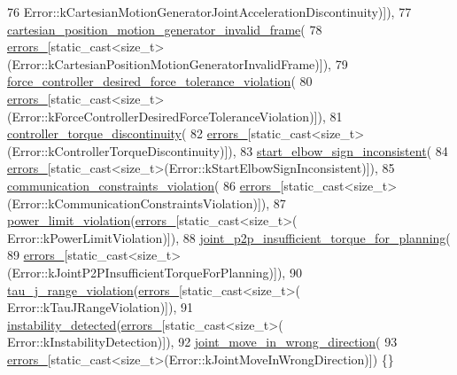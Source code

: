 \begin{DoxyCode}
76           Error::kCartesianMotionGeneratorJointAccelerationDiscontinuity)]),
77       \hyperlink{structfranka_1_1Errors_aa1952c6da2f81578861a19b947c97b85}{cartesian\_position\_motion\_generator\_invalid\_frame}(
78           \hyperlink{structfranka_1_1Errors_ab269bb0ad30eb1aaa7009a246be8e8aa}{errors\_}[static\_cast<size\_t>(Error::kCartesianPositionMotionGeneratorInvalidFrame)]),
79       \hyperlink{structfranka_1_1Errors_ae474f20a64b2585dbe6496966dddff0a}{force\_controller\_desired\_force\_tolerance\_violation}(
80           \hyperlink{structfranka_1_1Errors_ab269bb0ad30eb1aaa7009a246be8e8aa}{errors\_}[static\_cast<size\_t>(Error::kForceControllerDesiredForceToleranceViolation)]),
81       \hyperlink{structfranka_1_1Errors_af40d93759ace9ee6026208110692a732}{controller\_torque\_discontinuity}(
82           \hyperlink{structfranka_1_1Errors_ab269bb0ad30eb1aaa7009a246be8e8aa}{errors\_}[static\_cast<size\_t>(Error::kControllerTorqueDiscontinuity)]),
83       \hyperlink{structfranka_1_1Errors_aa6de1956ac056792a1dea6b9ddd52a50}{start\_elbow\_sign\_inconsistent}(
84           \hyperlink{structfranka_1_1Errors_ab269bb0ad30eb1aaa7009a246be8e8aa}{errors\_}[static\_cast<size\_t>(Error::kStartElbowSignInconsistent)]),
85       \hyperlink{structfranka_1_1Errors_a4d17af86c1ebb698c218796fa15f9bd7}{communication\_constraints\_violation}(
86           \hyperlink{structfranka_1_1Errors_ab269bb0ad30eb1aaa7009a246be8e8aa}{errors\_}[static\_cast<size\_t>(Error::kCommunicationConstraintsViolation)]),
87       \hyperlink{structfranka_1_1Errors_a6c4d8cb1fb314567ebd07a6195b840f5}{power\_limit\_violation}(\hyperlink{structfranka_1_1Errors_ab269bb0ad30eb1aaa7009a246be8e8aa}{errors\_}[static\_cast<size\_t>(
      Error::kPowerLimitViolation)]),
88       \hyperlink{structfranka_1_1Errors_a1c78be870253b510a4516acf14c2d3e3}{joint\_p2p\_insufficient\_torque\_for\_planning}(
89           \hyperlink{structfranka_1_1Errors_ab269bb0ad30eb1aaa7009a246be8e8aa}{errors\_}[static\_cast<size\_t>(Error::kJointP2PInsufficientTorqueForPlanning)]),
90       \hyperlink{structfranka_1_1Errors_a1491f8428341649befa3d088aebb317e}{tau\_j\_range\_violation}(\hyperlink{structfranka_1_1Errors_ab269bb0ad30eb1aaa7009a246be8e8aa}{errors\_}[static\_cast<size\_t>(
      Error::kTauJRangeViolation)]),
91       \hyperlink{structfranka_1_1Errors_aebb701987262097687d21b3cf1bc8930}{instability\_detected}(\hyperlink{structfranka_1_1Errors_ab269bb0ad30eb1aaa7009a246be8e8aa}{errors\_}[static\_cast<size\_t>(
      Error::kInstabilityDetection)]),
92       \hyperlink{structfranka_1_1Errors_a7d3a6480cbe572fd46e579b43732edc9}{joint\_move\_in\_wrong\_direction}(
93           \hyperlink{structfranka_1_1Errors_ab269bb0ad30eb1aaa7009a246be8e8aa}{errors\_}[static\_cast<size\_t>(Error::kJointMoveInWrongDirection)]) \{\}
\end{DoxyCode}


